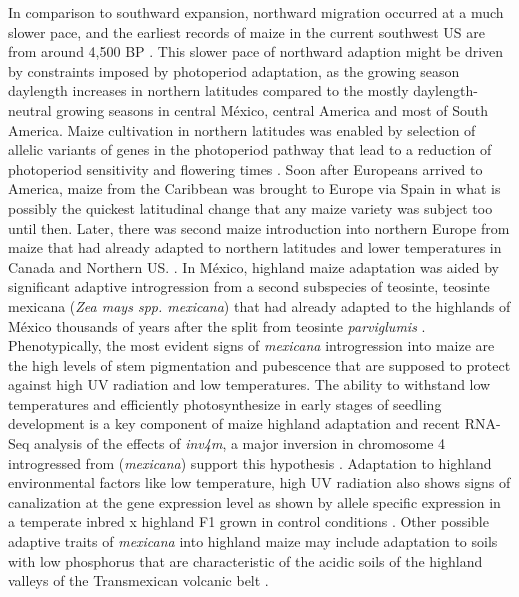 \documentclass[9pt,twocolumn,twoside]{BioRxiv}
\begin{document}
In comparison to southward expansion, northward migration occurred at a much slower pace, and the earliest records of maize in the current southwest US are from around 4,500 BP \citep{Da_Fonseca2015-zh, Swarts2017-ge}. 
This slower pace of northward adaption might be driven by constraints imposed by photoperiod adaptation, as the growing season daylength increases in northern latitudes compared to the mostly daylength-neutral growing seasons in central México, central America and most of South America.  
Maize cultivation in northern latitudes was enabled by selection of allelic variants of genes in the photoperiod pathway that lead to a reduction of photoperiod sensitivity and flowering times \citep{Liang2018-af, Guo2018-on, Coles2010-db, Huang2018-ga, Yang2013-lg, Salvi2007-ku, Wang2017-bc, Hung2012-ms}.
Soon after Europeans arrived to America, maize from the Caribbean was brought to Europe via Spain \citep{Brandolini1968-eu, Brandenburg2017-ii} in what is possibly the quickest latitudinal change that any maize variety was subject too until then. 
Later, there was second maize introduction into northern Europe from maize that had already adapted to northern latitudes and lower temperatures in Canada and Northern US. \citep{Brandenburg2017-ii}. 
In México, highland maize adaptation was aided by significant adaptive introgression from a second subspecies of teosinte, teosinte mexicana (\textit{Zea mays spp. mexicana}) that had already adapted to the highlands of México thousands of years after the split from teosinte \textit{parviglumis} \citep{Hufford2013-gs, Gonzalez-Segovia2019-jy}. 
Phenotypically, the most evident signs of \textit{mexicana} introgression into maize are the high levels of stem pigmentation and pubescence \citep{Lauter2004-eq} that are supposed to protect against high UV radiation and low temperatures. 
The ability to withstand low temperatures and efficiently photosynthesize in early stages of seedling development is a key component of maize highland adaptation \citep{Hardacre1980-tq} and recent RNA-Seq analysis of the effects of \textit{inv4m}, a major inversion in chromosome 4 introgressed from (\textit{mexicana}) support this hypothesis \cite{Crow2020-gene}. 
Adaptation to highland environmental factors like low temperature, high UV radiation also shows signs of canalization at the gene expression level as shown by allele specific expression in a temperate inbred x highland F1 grown in control conditions \cite{Aguilar-Rangel2017-rm}.
Other possible adaptive traits of \textit{mexicana} into highland maize may include adaptation to soils with low phosphorus \citep{AguirreLiguori2019-fl, Fustier2017-sl} that are characteristic of the acidic soils of the highland valleys of the Transmexican volcanic belt \citep{Krasilnikov2013-sm}.
\end{document}

